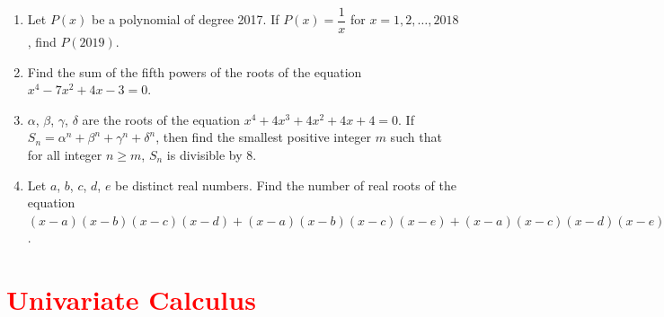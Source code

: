 \documentclass[11pt, a4paper]{article}
\begin{document}
\begin{enumerate}
	\item Let $P(x)$ be a polynomial of degree 2017. If $P(x) = \dfrac{1}{x}$ for $x = 1, 2, \ldots, 2018$, find $P(2019)$.
	
	\item Find the sum of the fifth powers of the roots of the equation $x^4 - 7x^2 + 4x - 3 = 0$.
	
	\item $\alpha$, $\beta$, $\gamma$, $\delta$ are the roots of the equation $x^4 + 4x^3 + 4x^2 + 4x + 4 = 0$. If $S_n = \alpha^n + \beta^n + \gamma^n + \delta^n$, then find the smallest positive integer $m$ such that for all integer $n \geq m$, $S_n$ is divisible by 8.
	
	\item Let $a$, $b$, $c$, $d$, $e$ be distinct real numbers. Find the number of real roots of the equation $(x-a)(x-b)(x-c)(x-d) + (x-a)(x-b)(x-c)(x-e) + (x-a)(x-c)(x-d)(x-e) + (x-b)(x-c)(x-d)(x-e) + (x-a)(x-b)(x-d)(x-e) = 0$.	
	
\end{enumerate}
















\section{\textcolor{red}{Univariate Calculus}}
\end{document}
